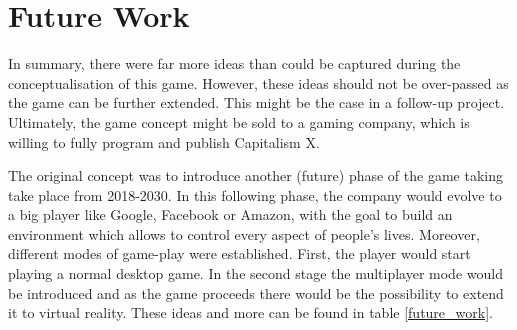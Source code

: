 \documentclass[11pt,titlepage,oneside,openany]{book}
\begin{document}

\section{Future Work}
\label{sec:future}
In summary, there were far more ideas than could be captured during the conceptualisation of this game. However, these ideas should not be over-passed as the game can be further extended. This might be the case in a follow-up project. Ultimately, the game concept might be sold to a gaming company, which is willing to fully program and publish Capitalism X. 

The original concept was to introduce another (future) phase of the game taking take place from 2018-2030. In this following phase, the company would evolve to a big player like Google, Facebook or Amazon, with the goal to build an environment which allows to control every aspect of people’s lives. 
Moreover, different modes of game-play were established. First, the player would start playing a normal desktop game. In the second stage the multiplayer mode would be introduced and as the game proceeds there would be the possibility to extend it to virtual reality. These ideas and more can be found in table \ref{future_work}.
\end{document}

